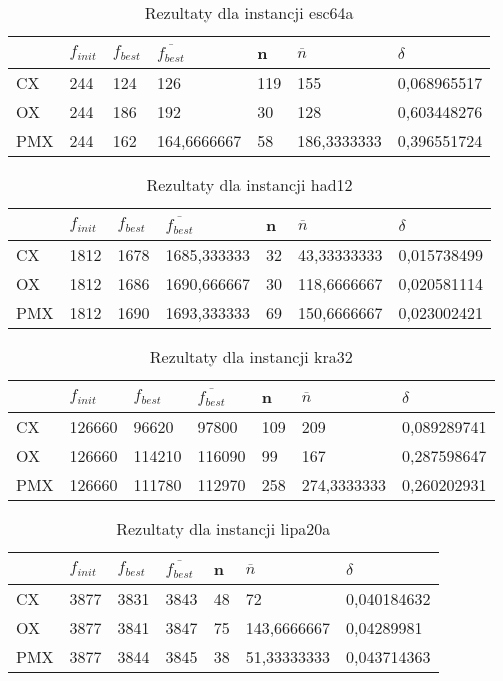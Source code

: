 \begin{table}[H]
\label{T2_esc64a}
\begin{tabular}{l l l l l l l}
\hline
 & $f_{init}$ & $f_{best}$ & $\overline{f_{best}}$ & n & $\overline{n}$ & $\delta$ \\
\hline
CX & 244 & 124 & 126 & 119 & 155 & 0,068965517\\
OX & 244 & 186 & 192 & 30 & 128 & 0,603448276\\
PMX & 244 & 162 & 164,6666667 & 58 & 186,3333333 & 0,396551724\\
\hline
\end{tabular}
\caption{Rezultaty dla instancji esc64a}
\end{table}

\begin{table}[H]
\label{T2_had12}
\begin{tabular}{l l l l l l l}
\hline
 & $f_{init}$ & $f_{best}$ & $\overline{f_{best}}$ & n & $\overline{n}$ & $\delta$ \\
\hline
CX & 1812 & 1678 & 1685,333333 & 32 & 43,33333333 & 0,015738499\\
OX & 1812 & 1686 & 1690,666667 & 30 & 118,6666667 & 0,020581114\\
PMX	& 1812 & 1690 & 1693,333333 & 69 & 150,6666667 & 0,023002421\\
\hline
\end{tabular}
\caption{Rezultaty dla instancji had12}
\end{table}

\begin{table}[H]
\label{T1_kra32}
\begin{tabular}{l l l l l l l}
\hline
 & $f_{init}$ & $f_{best}$ & $\overline{f_{best}}$ & n & $\overline{n}$ & $\delta$ \\
\hline
CX & 126660 & 96620 & 97800 & 109 & 209 & 0,089289741\\
OX & 126660 & 114210 & 116090 & 99 & 167 & 0,287598647\\
PMX & 126660 & 111780 & 112970 & 258 & 274,3333333 & 0,260202931\\
\hline
\end{tabular}
\caption{Rezultaty dla instancji kra32}
\end{table}

\begin{table}[H]
\label{T2_lipa20a}
\begin{tabular}{l l l l l l l}
\hline
 & $f_{init}$ & $f_{best}$ & $\overline{f_{best}}$ & n & $\overline{n}$ & $\delta$ \\
\hline
CX & 3877 & 3831 & 3843 & 48 & 72 & 0,040184632\\
OX & 3877 & 3841 & 3847 & 75 & 143,6666667 & 0,04289981\\
PMX & 3877 & 3844 & 3845 & 38 & 51,33333333 & 0,043714363\\
\hline
\end{tabular}
\caption{Rezultaty dla instancji lipa20a}
\end{table}

